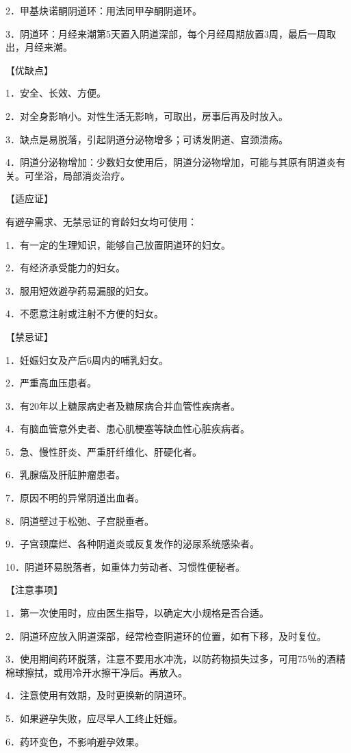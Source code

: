\documentclass[12pt,UTF8,openany]{ctexbook}
\begin{document}
2．甲基炔诺酮阴道环：用法同甲孕酮阴道环。

3．阴道环：月经来潮第5天置入阴道深部，每个月经周期放置3周，最后一周取出，月经来潮。

【优缺点】

1．安全、长效、方便。

2．对全身影响小。对性生活无影响，可取出，房事后再及时放入。

3．缺点是易脱落，引起阴道分泌物增多；可诱发阴道、宫颈溃疡。

4．阴道分泌物增加：少数妇女使用后，阴道分泌物增加，可能与其原有阴道炎有关。可坐浴，局部消炎治疗。

【适应证】

有避孕需求、无禁忌证的育龄妇女均可使用：

1．有一定的生理知识，能够自己放置阴道环的妇女。

2．有经济承受能力的妇女。

3．服用短效避孕药易漏服的妇女。

4．不愿意注射或注射不方便的妇女。

【禁忌证】

1．妊娠妇女及产后6周内的哺乳妇女。

2．严重高血压患者。

3．有20年以上糖尿病史者及糖尿病合并血管性疾病者。

4．有脑血管意外史者、患心肌梗塞等缺血性心脏疾病者。

5．急、慢性肝炎、严重肝纤维化、肝硬化者。

6．乳腺癌及肝脏肿瘤患者。

7．原因不明的异常阴道出血者。

8．阴道壁过于松弛、子宫脱垂者。

9．子宫颈糜烂、各种阴道炎或反复发作的泌尿系统感染者。

10．阴道环易脱落者，如重体力劳动者、习惯性便秘者。

【注意事项】

1．第一次使用时，应由医生指导，以确定大小规格是否合适。

2．阴道环应放入阴道深部，经常检查阴道环的位置，如有下移，及时复位。

3．使用期间药环脱落，注意不要用水冲洗，以防药物损失过多，可用75％的酒精棉球擦拭，或用冷开水擦干净后。再放入。

4．注意使用有效期，及时更换新的阴道环。

5．如果避孕失败，应尽早人工终止妊娠。

6．药环变色，不影响避孕效果。
\end{document}

